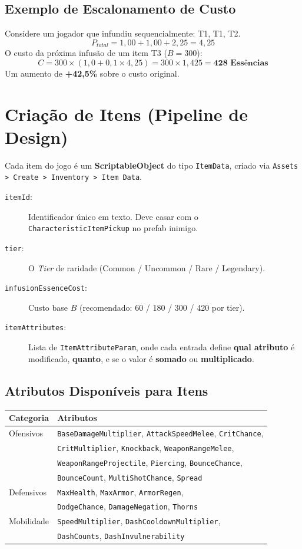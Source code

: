 \documentclass[a4paper,12pt]{report}
\begin{document}
\subsection{Exemplo de Escalonamento de Custo}
Considere um jogador que infundiu sequencialmente: T1, T1, T2.
\[
P_{total} = 1{,}00 + 1{,}00 + 2{,}25 = 4{,}25
\]
O custo da próxima infusão de um item T3 ($B = 300$):
\[
C = 300 \times (1{,}0 + 0{,}1 \times 4{,}25) = 300 \times 1{,}425 = \textbf{428 Essências}
\]
Um aumento de \textbf{+42,5\%} sobre o custo original.

\section{Criação de Itens (Pipeline de Design)}
Cada item do jogo é um \textbf{ScriptableObject} do tipo \texttt{ItemData}, criado via \texttt{Assets > Create > Inventory > Item Data}.

\begin{description}
    \item[\texttt{itemId}:] Identificador único em texto. Deve casar com o \texttt{CharacteristicItemPickup} no prefab inimigo.
    \item[\texttt{tier}:] O \textit{Tier} de raridade (Common / Uncommon / Rare / Legendary).
    \item[\texttt{infusionEssenceCost}:] Custo base $B$ (recomendado: 60 / 180 / 300 / 420 por tier).
    \item[\texttt{itemAttributes}:] Lista de \texttt{ItemAttributeParam}, onde cada entrada define \textbf{qual atributo} é modificado, \textbf{quanto}, e se o valor é \textbf{somado} ou \textbf{multiplicado}.
\end{description}

\subsection{Atributos Disponíveis para Itens}
\begin{center}
\begin{tabular}{|l|l|}
    \hline
    \textbf{Categoria} & \textbf{Atributos} \\
    \hline
    Ofensivos  & \texttt{BaseDamageMultiplier}, \texttt{AttackSpeedMelee}, \texttt{CritChance}, \\
               & \texttt{CritMultiplier}, \texttt{Knockback}, \texttt{WeaponRangeMelee}, \\
               & \texttt{WeaponRangeProjectile}, \texttt{Piercing}, \texttt{BounceChance}, \\
               & \texttt{BounceCount}, \texttt{MultiShotChance}, \texttt{Spread} \\
    \hline
    Defensivos & \texttt{MaxHealth}, \texttt{MaxArmor}, \texttt{ArmorRegen}, \\
               & \texttt{DodgeChance}, \texttt{DamageNegation}, \texttt{Thorns} \\
    \hline
    Mobilidade & \texttt{SpeedMultiplier}, \texttt{DashCooldownMultiplier}, \\
               & \texttt{DashCounts}, \texttt{DashInvulnerability} \\
    \hline
\end{tabular}
\end{center}
\end{document}
